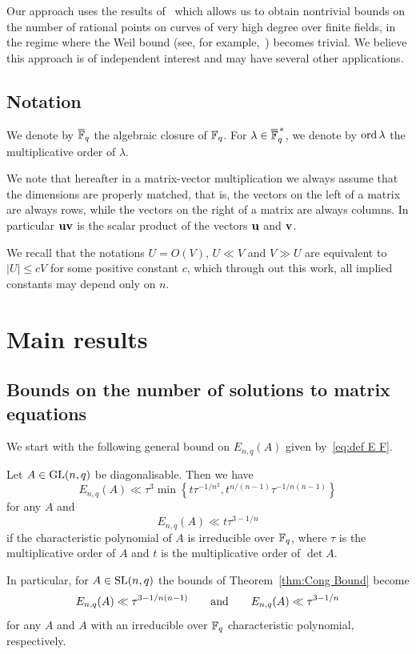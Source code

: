 \documentclass[12pt]{amsart}
\begin{document}
Our approach uses the results of~\cite{StoVol} which 
allows us to obtain nontrivial bounds on the number of rational points on curves of very high degree over finite fields, 
in the regime where the Weil bound (see, 
for example,~\cite[Section~X.5, Equation~(5.2)]{Lor}) becomes trivial. We believe 
this approach is of independent interest and may have several other applications.


  \subsection{Notation}
    We denote by  $ \overline {{\mathbb F}}_q$  the algebraic closure of ${\mathbb F}_q$.
For $\lambda \in  \overline {{\mathbb F}}_q^{\,*}$, we denote by $\operatorname{ord} \lambda$ the multiplicative order of $\lambda$. 


  We note that hereafter in a matrix-vector multiplication we always assume that the 
dimensions are properly matched, that is, the vectors on the left of a matrix are always rows, 
while the vectors on the right of  a matrix are always columns.  In particular $\mathbf{u} \mathbf{v}$ is the scalar product of the vectors $\mathbf{u}$ and $\mathbf{v}$. 
  
We recall that  the notations $U = O(V)$, $U \ll V$ and $ V\gg U$  
are equivalent to $|U|\leqslant c V$ for some positive constant $c$, 
which through out this work, all implied constants may depend only on $n$. 
 

\section{Main results}

\subsection{Bounds on the number of solutions to matrix equations}
   
We start with the following general bound on $E_{n,q}(A)$ given by~\eqref{eq:def E F}. 
   
\begin{thm}
\label{thm:Cong Bound}
Let  $A\in \operatorname{GL}(n,q)$ be diagonalisable.  
Then we have
$$
E_{n,q}(A) \ll \tau^3 \min\left\{t \tau^{-1/n^2}, t^{n/(n-1)}\tau^{-1/n(n-1)}\right\}
$$
for any $A$ and 
$$
E_{n,q}(A) \ll t\tau^{3-1/n}
$$
if the characteristic polynomial of $A$ is irreducible over ${\mathbb F}_q$, 
where $\tau$ is the multiplicative order of $A$ and $t$  is the multiplicative order of $\det A$.
\end{thm}

In particular, for  $A\in \operatorname{SL}(n,q)$ the bounds of Theorem~\ref{thm:Cong Bound}
become 
$$
E_{n,q}(A) \ll \tau^{3-1/n(n-1)} \qquad\mbox{and}\qquad E_{n,q}(A) \ll  \tau^{3-1/n}
$$ 
for any $A$ and $A$  with an irreducible over ${\mathbb F}_q$ characteristic polynomial, respectively. 
\end{document}
